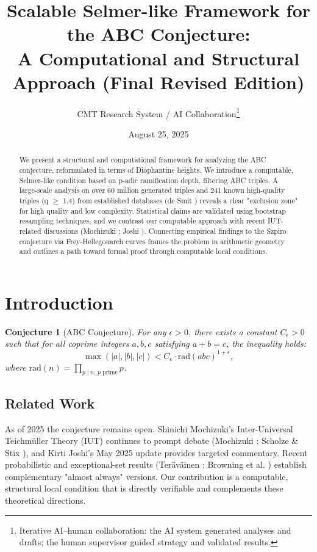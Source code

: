 \documentclass[11pt,a4paper]{article}
\title{Scalable Selmer-like Framework for the ABC Conjecture: \\ A Computational and Structural Approach (Final Revised Edition)}
\author{CMT Research System / AI Collaboration\thanks{Iterative AI--human collaboration: the AI system generated analyses and drafts; the human supervisor guided strategy and validated results.}}
\date{August 25, 2025}
\newtheorem{conjecture}{Conjecture}[section]
\newcommand{\rad}{\mathrm{rad}}
\begin{document}
\maketitle

\begin{abstract}
We present a structural and computational framework for analyzing the ABC conjecture, reformulated in terms of Diophantine heights. We introduce a computable, Selmer-like condition based on p-adic ramification depth, filtering ABC triples. A large-scale analysis on over 60 million generated triples and 241 known high-quality triples (q $\geq$ 1.4) from established databases (de Smit \cite{desmit}) reveals a clear "exclusion zone" for high quality and low complexity. Statistical claims are validated using bootstrap resampling techniques, and we contrast our computable approach with recent IUT-related discussions (Mochizuki \cite{mochizuki2021}; Joshi \cite{joshi2025}). Connecting empirical findings to the Szpiro conjecture via Frey-Hellegouarch curves frames the problem in arithmetic geometry and outlines a path toward formal proof through computable local conditions.
\end{abstract}

\tableofcontents
\bigskip

\section{Introduction}

\begin{conjecture}[ABC Conjecture]
For any $\epsilon > 0$, there exists a constant $C_\epsilon > 0$ such that for all coprime integers $a, b, c$ satisfying $a+b=c$, the inequality holds:
\[
    \max(|a|,|b|,|c|) < C_\epsilon \cdot \rad(abc)^{1+\epsilon},
\]
where $\rad(n) = \prod_{p\mid n,\, p \text{ prime}} p$.
\end{conjecture}

\subsection{Related Work}
As of 2025 the conjecture remains open. Shinichi Mochizuki's Inter-Universal Teichmüller Theory (IUT) continues to prompt debate (Mochizuki \cite{mochizuki2021}; Scholze \& Stix \cite{scholze2022}), and Kirti Joshi's May 2025 update \cite{joshi2025} provides targeted commentary. Recent probabilistic and exceptional-set results (Teräväinen \cite{teravainen2025}; Browning et al. \cite{browning2025}) establish complementary "almost always" versions. Our contribution is a computable, structural local condition that is directly verifiable and complements these theoretical directions.
\end{document}
